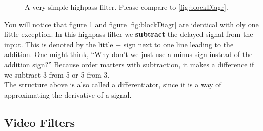 \begin{figure}[H]
  \centering
  \label{fig:string}
  \caption{A very simple highpass filter. Please compare to \ref{fig:blockDiagr}. }
  \label{fig:blockDiagrHigh}
\end{figure}

You will notice that figure \ref{fig:blockDiagrHigh} and figure \ref{fig:blockDiagr} are identical with oly one little exception. In this highpass filter we \textbf{subtract} the delayed signal from the input. This is denoted by the little $-$ sign next to one line leading to the addition. One might think, ``Why don't we just use a minus sign instead of the addition sign?'' Because order matters with subtraction, it makes a difference if we subtract 3 from 5 or 5 from 3.\\
The structure above is also called a differentiator, since it is a way of approximating the derivative of a signal.





\subsection{Video Filters}

